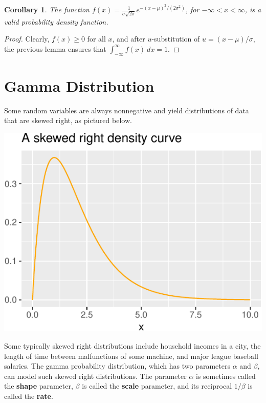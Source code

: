 \documentclass[
]{book}
\newtheorem{corollary}{Corollary}[chapter]
\theoremstyle{definition}
\theoremstyle{definition}
\theoremstyle{definition}
\theoremstyle{definition}
\theoremstyle{remark}
\begin{document}
\begin{corollary}
The function \(f(x) = \frac{1}{\sigma\sqrt{2\pi}}e^{-(x-\mu)^2/(2\sigma^2)}\), for \(-\infty < x <  \infty\), is a valid probability density function.
\end{corollary}

\begin{proof}
Clearly, \(f(x) \geq 0\) for all \(x\), and after \(u\)-substitution of \(u = (x-\mu)/\sigma\), the previous lemma ensures that \(\int_{-\infty}^\infty f(x)~dx = 1\).
\end{proof}

\section{Gamma Distribution}\label{gamma-distribution}

Some random variables are always nonnegative and yield distributions of data that are skewed right, as pictured below.

\includegraphics{math340-notes_files/figure-latex/unnamed-chunk-21-1.pdf}

Some typically skewed right distributions include household incomes in a city, the length of time between malfunctions of some machine, and major league baseball salaries. The gamma probability distribution, which has two parameters \(\alpha\) and \(\beta\), can model such skewed right distributions. The parameter \(\alpha\) is sometimes called the \textbf{shape} parameter, \(\beta\) is called the \textbf{scale} parameter, and its reciprocal \(1/\beta\) is called the \textbf{rate}.
\end{document}
